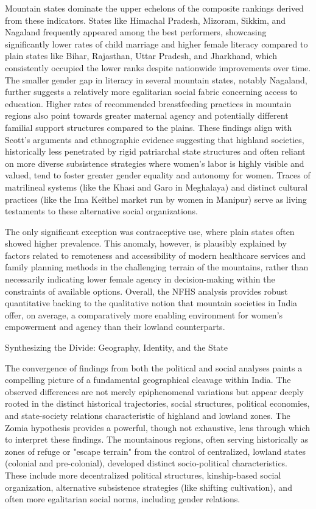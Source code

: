 Mountain states dominate the upper echelons of the composite rankings derived from these indicators. States like Himachal Pradesh, Mizoram, Sikkim, and Nagaland frequently appeared among the best performers, showcasing significantly lower rates of child marriage and higher female literacy compared to plain states like Bihar, Rajasthan, Uttar Pradesh, and Jharkhand, which consistently occupied the lower ranks despite nationwide improvements over time. The smaller gender gap in literacy in several mountain states, notably Nagaland, further suggests a relatively more egalitarian social fabric concerning access to education. Higher rates of recommended breastfeeding practices in mountain regions also point towards greater maternal agency and potentially different familial support structures compared to the plains. These findings align with Scott's arguments and ethnographic evidence suggesting that highland societies, historically less penetrated by rigid patriarchal state structures and often reliant on more diverse subsistence strategies where women's labor is highly visible and valued, tend to foster greater gender equality and autonomy for women. Traces of matrilineal systems (like the Khasi and Garo in Meghalaya) and distinct cultural practices (like the Ima Keithel market run by women in Manipur) serve as living testaments to these alternative social organizations.

The only significant exception was contraceptive use, where plain states often showed higher prevalence. This anomaly, however, is plausibly explained by factors related to remoteness and accessibility of modern healthcare services and family planning methods in the challenging terrain of the mountains, rather than necessarily indicating lower female agency in decision-making within the constraints of available options. Overall, the NFHS analysis provides robust quantitative backing to the qualitative notion that mountain societies in India offer, on average, a comparatively more enabling environment for women's empowerment and agency than their lowland counterparts.

Synthesizing the Divide: Geography, Identity, and the State

The convergence of findings from both the political and social analyses paints a compelling picture of a fundamental geographical cleavage within India. The observed differences are not merely epiphenomenal variations but appear deeply rooted in the distinct historical trajectories, social structures, political economies, and state-society relations characteristic of highland and lowland zones. The Zomia hypothesis provides a powerful, though not exhaustive, lens through which to interpret these findings. The mountainous regions, often serving historically as zones of refuge or "escape terrain" from the control of centralized, lowland states (colonial and pre-colonial), developed distinct socio-political characteristics. These include more decentralized political structures, kinship-based social organization, alternative subsistence strategies (like shifting cultivation), and often more egalitarian social norms, including gender relations.

